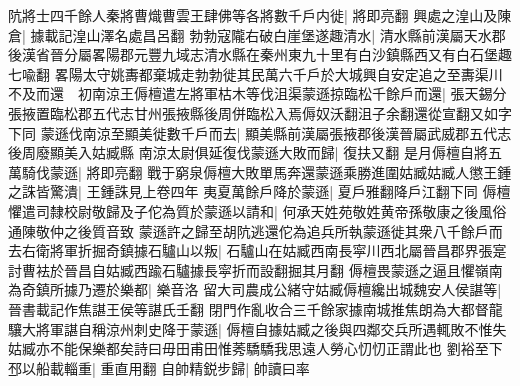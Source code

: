 阬將士四千餘人秦將曹熾曹雲王肆佛等各將數千戶内徙|{
	將即亮翻}
興處之湟山及陳倉|{
	據載記湟山澤名處昌呂翻}
勃勃寇隴右破白崖堡遂趣清水|{
	清水縣前漢屬天水郡後漢省晉分屬畧陽郡元豐九域志清水縣在秦州東九十里有白沙鎮縣西又有白石堡趣七喩翻}
畧陽太守姚夀都棄城走勃勃徙其民萬六千戶於大城興自安定追之至夀渠川不及而還　初南涼王傉檀遣左將軍枯木等伐沮渠蒙遜掠臨松千餘戶而還|{
	張天錫分張掖置臨松郡五代志甘州張掖縣後周併臨松入焉傉奴沃翻沮子余翻還從宣翻又如字下同}
蒙遜伐南涼至顯美徙數千戶而去|{
	顯美縣前漢屬張掖郡後漢晉屬武威郡五代志後周廢顯美入姑臧縣}
南涼太尉俱延復伐蒙遜大敗而歸|{
	復扶又翻}
是月傉檀自將五萬騎伐蒙遜|{
	將即亮翻}
戰于窮泉傉檀大敗單馬奔還蒙遜乘勝進圍姑臧姑臧人懲王鍾之誅皆驚潰|{
	王鍾誅見上卷四年}
夷夏萬餘戶降於蒙遜|{
	夏戶雅翻降戶江翻下同}
傉檀懼遣司隸校尉敬歸及子佗為質於蒙遜以請和|{
	何承天姓苑敬姓黄帝孫敬康之後風俗通陳敬仲之後質音致}
蒙遜許之歸至胡阬逃還佗為追兵所執蒙遜徙其衆八千餘戶而去右衛將軍折掘奇鎮據石驢山以叛|{
	石驢山在姑臧西南長寜川西北屬晉昌郡界張寔討曹袪於晉昌自姑臧西踰石驢據長寜折而設翻掘其月翻}
傉檀畏蒙遜之逼且懼嶺南為奇鎮所據乃遷於樂都|{
	樂音洛}
留大司農成公緒守姑臧傉檀纔出城魏安人侯諶等|{
	晉書載記作焦諶王侯等諶氏壬翻}
閉門作亂收合三千餘家據南城推焦朗為大都督龍驤大將軍諶自稱涼州刺史降于蒙遜|{
	傉檀自據姑臧之後與四鄰交兵所遇輒敗不惟失姑臧亦不能保樂都矣詩曰毋田甫田惟莠驕驕我思遠人勞心忉忉正謂此也}
劉裕至下邳以船載輜重|{
	重直用翻}
自帥精鋭步歸|{
	帥讀曰率}


